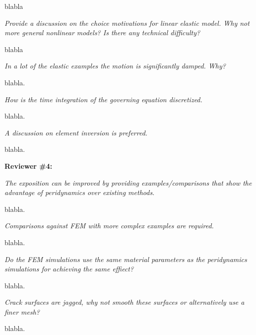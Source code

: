 blabla

\emph{Provide a discussion on the choice motivations for linear elastic model. Why not more general nonlinear models? Is there any technical difficulty?}

blabla

\emph{In a lot of the elastic examples the motion is significantly damped. Why?}

blabla.

\emph{How is the time integration of the governing equation discretized.}

blabla.

\emph{A discussion on element inversion is preferred.}

blabla.

\noindent{}\textbf{Reviewer \#4:}

\emph{The exposition can be improved by providing examples/comparisons that show the advantage of peridynamics over existing methods.}

blabla.

\emph{Comparisons against FEM with more complex examples are required.}

blabla.

\emph{Do the FEM simulations use the same material parameters as the peridynamics simulations for achieving the same effiect?}

blabla.

\emph{Crack surfaces are jagged, why not smooth these surfaces or alternatively use a finer mesh?}

blabla.



%

%



